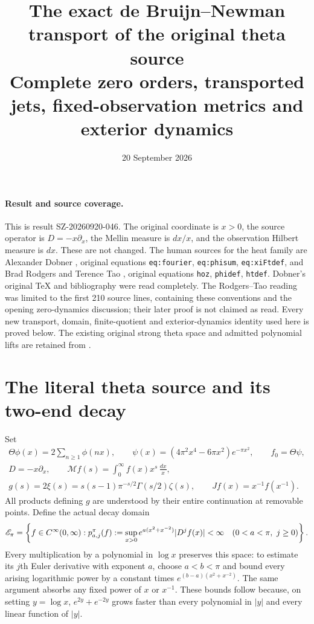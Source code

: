 \documentclass[11pt]{article}
\title{The exact de Bruijn--Newman transport of the original theta source\\
Complete zero orders, transported jets, fixed-observation metrics and exterior dynamics}
\author{}\date{20 September 2026}
\newcommand{\Mell}{\mathcal M}\newcommand{\Sch}{\mathcal S}
\begin{document}
\maketitle

\paragraph{Result and source coverage.}
This is result SZ-20260920-046. The original coordinate is $x>0$,
the source operator is $D=-x\partial_x$, the Mellin measure is $dx/x$,
and the observation Hilbert measure is $dx$. These are not changed.
The human sources for the heat family are Alexander Dobner
\cite{Dobner}, original equations \texttt{eq:fourier},
\texttt{eq:phisum}, \texttt{eq:xiFtdef}, and Brad Rodgers and
Terence Tao \cite{RT}, original equations \texttt{hoz},
\texttt{phidef}, \texttt{htdef}. Dobner's original TeX and bibliography
were read completely. The Rodgers--Tao reading was limited to the
first 210 source lines, containing these conventions and the opening
zero-dynamics discussion; their later proof is not claimed as read.
Every new transport, domain, finite-quotient and exterior-dynamics
identity used here is proved below. The existing original strong
theta space and admitted polynomial lifts are retained from
\cite{Closed,Native}.

\section{The literal theta source and its two-end decay}

Set
\begin{equation}\label{eq:objects}
\begin{gathered}
\Theta\phi(x)=2\sum_{n\geq1}\phi(nx),\qquad
\psi(x)=(4\pi^2x^4-6\pi x^2)e^{-\pi x^2},\qquad f_0=\Theta\psi,\\
D=-x\partial_x,\qquad
\Mell f(s)=\int_0^\infty f(x)x^s\,\frac{dx}{x},\\
g(s)=2\xi(s)=s(s-1)\pi^{-s/2}\Gamma(s/2)\zeta(s),\qquad
Jf(x)=x^{-1}f(x^{-1}).
\end{gathered}
\end{equation}
All products defining $g$ are understood by their entire continuation
at removable points. Define the actual decay domain
\begin{equation}\label{eq:Epi}
\mathscr E_\pi=\left\{f\in C^\infty(0,\infty):
p_{a,j}^{\pi}(f):=\sup_{x>0}e^{a(x^2+x^{-2})}|D^jf(x)|<\infty
\quad(0<a<\pi,\ j\geq0)\right\}.
\end{equation}
Every multiplication by a polynomial in $\log x$ preserves this
space: to estimate its $j$th Euler derivative with exponent $a$, choose
$a<b<\pi$ and bound every arising logarithmic power by a constant
times $e^{(b-a)(x^2+x^{-2})}$. The same argument absorbs any fixed
power of $x$ or $x^{-1}$. These bounds follow because, on setting
$y=\log x$, $e^{2y}+e^{-2y}$ grows faster than every polynomial in
$|y|$ and every linear function of $|y|$.
\end{document}
